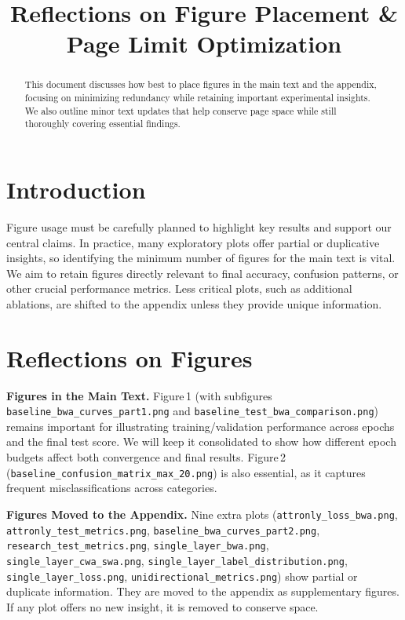 \documentclass[11pt]{article}
\begin{document}
\title{Reflections on Figure Placement \& Page Limit Optimization}
\maketitle

\begin{abstract}
This document discusses how best to place figures in the main text and the appendix, focusing on minimizing redundancy while retaining important experimental insights. We also outline minor text updates that help conserve page space while still thoroughly covering essential findings.
\end{abstract}

\section{Introduction}
Figure usage must be carefully planned to highlight key results and support our central claims. In practice, many exploratory plots offer partial or duplicative insights, so identifying the minimum number of figures for the main text is vital. We aim to retain figures directly relevant to final accuracy, confusion patterns, or other crucial performance metrics. Less critical plots, such as additional ablations, are shifted to the appendix unless they provide unique information.

\section{Reflections on Figures}
\textbf{Figures in the Main Text.} Figure\,1 (with subfigures \texttt{baseline\_bwa\_curves\_part1.png} and \texttt{baseline\_test\_bwa\_comparison.png}) remains important for illustrating training/validation performance across epochs and the final test score. We will keep it consolidated to show how different epoch budgets affect both convergence and final results. Figure\,2 (\texttt{baseline\_confusion\_matrix\_max\_20.png}) is also essential, as it captures frequent misclassifications across categories.

\textbf{Figures Moved to the Appendix.} Nine extra plots (\texttt{attronly\_loss\_bwa.png}, \texttt{attronly\_test\_metrics.png}, \texttt{baseline\_bwa\_curves\_part2.png}, \texttt{research\_test\_metrics.png}, \texttt{single\_layer\_bwa.png}, \texttt{single\_layer\_cwa\_swa.png}, \texttt{single\_layer\_label\_distribution.png}, \texttt{single\_layer\_loss.png}, \texttt{unidirectional\_metrics.png}) show partial or duplicate information. They are moved to the appendix as supplementary figures. If any plot offers no new insight, it is removed to conserve space.
\end{document}
